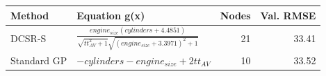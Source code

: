 \begin{tabular}{lp{9cm}rr}
\toprule
Method & Equation g(x) & Nodes & Val. RMSE \\
\midrule
DCSR-S & $\frac{engine_{size} \left(cylinders + 4.4851\right)}{\sqrt{tt_{AV}^{2} + 1} \sqrt{\left(engine_{size} + 3.3971\right)^{2} + 1}}$ & 21 & 33.41 \\
Standard GP & $- cylinders - engine_{size} + 2 tt_{AV}$ & 10 & 33.52 \\
\bottomrule
\end{tabular}
